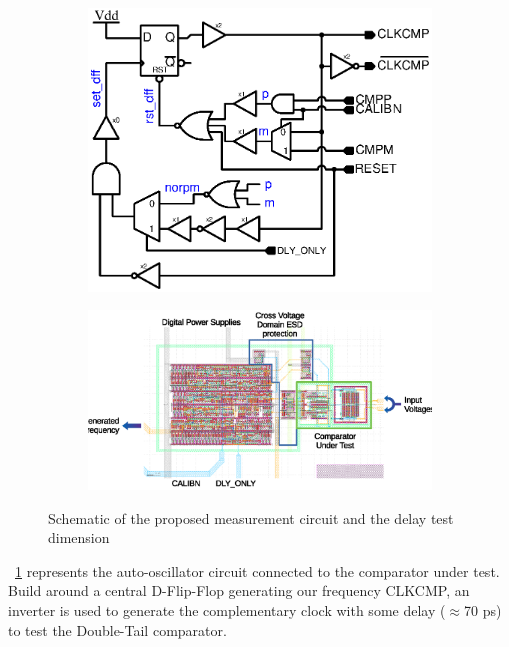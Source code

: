 \begin{figure}[htp]
    \centering
    \begin{subfigure}[b]{0.47\linewidth}
	    \includegraphics[width=\textwidth]{Chapter5/Figs/test_delay_comp_new_simp.ps}
    \end{subfigure}
    \begin{subfigure}[b]{0.50\linewidth}
	    \includegraphics[width=\textwidth]{Chapter5/Figs/layout_delay_meas.eps}
    \end{subfigure}
    \caption{Schematic of the proposed measurement circuit and the delay test dimension}
	\label{fig:meas_circ_schem}
\end{figure}

\figurename~\ref{fig:meas_circ_schem} represents the auto-oscillator circuit connected to the comparator under test. Build around a central D-Flip-Flop generating our frequency CLKCMP, an inverter is used to generate the complementary clock with some delay (\(\approx\)70 ps) to test the Double-Tail comparator.

